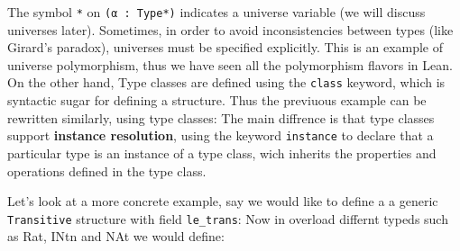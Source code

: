 The symbol \lstinline[language=lean]|*| on  \lstinline[language=lean]|(α : Type*)| 
indicates a universe variable (we will discuss universes later). Sometimes, 
in order to avoid
inconsistencies between types (like Girard's paradox), universes must be specified explicitly. 
This is an example
of universe polymorphism, thus we have seen all the polymorphism flavors in Lean.
On the other hand, Type classes are defined using the \lstinline[language=lean]|class| keyword, 
which is syntactic sugar for defining a structure.
Thus the previuous example can be rewritten similarly, using type classes:
The main diffrence is that type classes support \textbf{instance resolution}, using the keyword 
\lstinline[language=lean]|instance| to declare that a particular type is an instance of a type class, 
wich inherits 
the properties and operations defined in the type class.

Let's look at a more concrete example, say we would like to define a a generic \lstinline[language=lean]|Transitive| 
structure with field \lstinline[language=lean]|le_trans|:
Now in overload differnt typeds such as Rat, INtn and NAt we would define:




